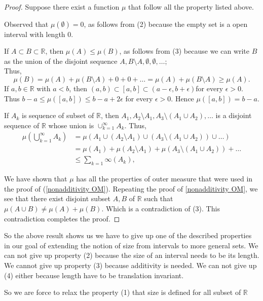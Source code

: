 \begin{proof}
    Suppose there exist a function $\mu$ that follow all the property listed above.

    Observed that $\mu(\emptyset)=0$, as follows from (2) because the empty set is a open interval with length 0.

    If $A\subset B\subset \mathds{R}$, then $\mu(A)\le \mu(B)$, as follows from (3) because we can write $B$ as the union of the disjoint sequence $A,B\setminus A,\emptyset,\emptyset,\ldots$;\\
    Thus,
    \[
    \mu(B)=\mu(A)+\mu(B\setminus A)+0+0+\ldots=\mu(A)+\mu(B\setminus A)\ge \mu(A).
    \]
    If $a,b\in \mathds{R}$ with $a<b$, then $(a,b)\subset [a,b]\subset (a-\epsilon,b+\epsilon)$for every $\epsilon>0$. Thus $b-a\le \mu([a,b])\le b-a+2\epsilon$ for every $\epsilon>0$.
    Hence $\mu([a,b])=b-a$.

    If ${A_k}$ is sequence of subset of $\mathds{R}$, then $A_1,A_2\setminus A_1,A_3\setminus (A_1\cup A_2),\ldots$ is a disjoint sequence of $\mathds{R}$ whose union is $\cup_{k=1}^{\infty}A_k$. Thus,
    \begin{align*}
        \mu\left(\bigcup_{k=1}^{\infty}A_k\right)&=\mu(A_1\cup(A_2\setminus A_1)\cup(A_3\setminus (A_1\cup A_2))\cup\ldots)\\
        &=\mu(A_1)+\mu(A_2\setminus A_1)+\mu(A_3\setminus (A_1\cup A_2))+\ldots\\
        &\le\sum_{k=1}{\infty}(A_k),
    \end{align*}

    We have shown that $\mu$ has all the properties of outer measure  that were used in the proof of (\ref{nonadditivity OM}). Repeating the proof of \ref{nonadditivity OM}, we see that there exist disjoint subset $A,B$ of $\mathds{R}$ such that $\mu(A\cup B)\neq\mu(A)+\mu(B)$. Which is a contradiction of (3). This contradiction completes the proof.
\end{proof}
So the above result shows us we have to give up one of the described properties in our goal of extending the notion of size from intervals to more general sets. 
We can not give up property (2) because the size of an interval needs to be its length. We cannot give up property (3) because additivity is needed. We can not give up (4) either because length have to be translation invariant.


So we are force to relax the property (1) that size is defined for all subset of $\mathds{R}$ 

